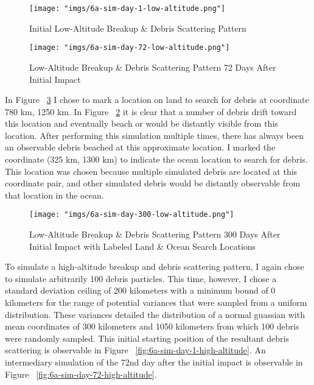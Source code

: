 \documentclass[11pt]{article}
\begin{document}
\begin{figure}[htbp]
    \centering
    \texttt{[image: "imgs/6a-sim-day-1-low-altitude.png"]} %
    \caption{Initial Low-Altitude Breakup \& Debris Scattering Pattern}
    \label{fig:6a-sim-day-1-low-altitude}
\end{figure}
\FloatBarrier

\begin{figure}[htbp]
    \centering
    \texttt{[image: "imgs/6a-sim-day-72-low-altitude.png"]} %
    \caption{Low-Altitude Breakup \& Debris Scattering Pattern 72 Days After Initial Impact}
    \label{fig:6a-sim-day-72-low-altitude}
\end{figure}
\FloatBarrier

In Figure ~\ref{fig:6a-sim-day-300-low-altitude} I chose to mark a location on land to search for debris at coordinate 780 km, 1250 km. In Figure ~\ref{fig:6a-sim-day-72-low-altitude} it is clear that a number of debris drift toward this location and eventually beach or would be distantly visible from this location. After performing this simulation multiple times, there has always been an observable debris beached at this approximate location. I marked the coordinate (325 km, 1300 km) to indicate the ocean location to search for debris. This location was chosen because multiple simulated debris are located at this coordinate pair, and other simulated debris would be distantly observable from that location in the ocean.

\begin{figure}[htbp]
    \centering
    \texttt{[image: "imgs/6a-sim-day-300-low-altitude.png"]} %
    \caption{Low-Altitude Breakup \& Debris Scattering Pattern 300 Days After Initial Impact with Labeled Land \& Ocean Search Locations}
    \label{fig:6a-sim-day-300-low-altitude}
\end{figure}
\FloatBarrier

To simulate a high-altitude breakup and debris scattering pattern, I again chose to simulate arbitrarily 100 debris particles. This time, however, I chose a standard deviation ceiling of 200 kilometers with a minimum bound of 0 kilometers for the range of potential variances that were sampled from a uniform distribution. These variances detailed the distribution of a normal guassian with mean coordinates of 300 kilometers and 1050 kilometers from which 100 debris were randomly sampled. This initial starting position of the resultant debris scattering is observable in Figure ~\ref{fig:6a-sim-day-1-high-altitude}. An intermediary simulation of the 72nd day after the initial impact is observable in Figure ~\ref{fig:6a-sim-day-72-high-altitude}.
\end{document}
